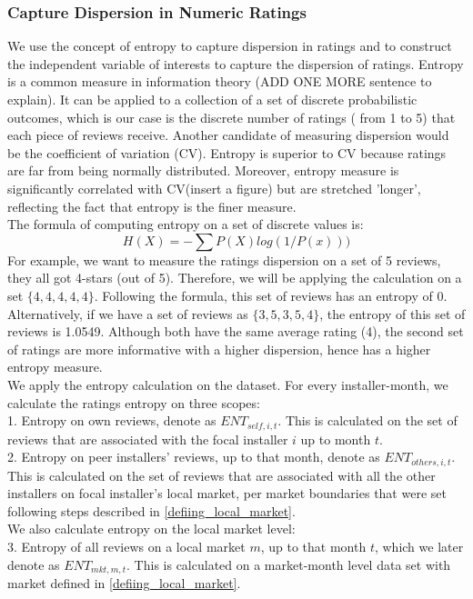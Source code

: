 \documentclass[msom,blindrev]{informs3}
\begin{document}
\subsubsection{Capture Dispersion in Numeric Ratings}
We use the concept of entropy to capture dispersion in ratings and to construct the independent variable of interests to capture the dispersion of ratings. Entropy is a common measure in information theory (ADD ONE MORE sentence to explain). It can be applied to a collection of a set of discrete probabilistic outcomes, which is our case is the discrete number of ratings ( from 1 to 5) that each piece of reviews receive. Another candidate of measuring dispersion would be the coefficient of variation (CV). Entropy is superior to CV because ratings are far from being normally distributed. Moreover, entropy measure is significantly correlated with CV(insert a figure) but are stretched 'longer', reflecting the fact that entropy is the finer measure. \\ 
The formula of computing entropy on a set of discrete values is:  \\ 
\begin{equation}
H(X)=-\sum P(X)log(1/P(x)))
\end{equation}
For example, we want to measure the ratings dispersion on a set of 5 reviews, they all got 4-stars (out of 5). Therefore, we will be applying the calculation on a set $\{4,4,4,4,4\}$. Following the formula, this set of reviews has an entropy of 0. Alternatively, if we have a set of reviews as $\{3,5,3,5,4\}$, the entropy of this set of reviews is 1.0549.  Although both have the same average rating (4), the second set of ratings are more informative with a higher dispersion, hence has a higher entropy measure. \\

We apply the entropy calculation on the dataset. For every installer-month, we calculate the ratings entropy on three scopes: \\
1. Entropy on own reviews, denote as $ENT_{self,i,t}$. This is calculated on the set of reviews that are associated with the focal installer $i$ up to month $t$.  \\ 
2. Entropy on peer installers' reviews, up to that month, denote as $ENT_{others,i,t}$. This is calculated on the set of reviews that are associated with all the other installers on focal installer's local market, per market boundaries that were set following steps described in \ref{defiing_local_market}.  \\
We also calculate entropy on the local market level:\\
3. Entropy of all reviews on a local market $m$, up to that month $t$, which we later denote as $ENT_{mkt,m,t}$. This is calculated on a market-month level data set with market defined in \ref{defiing_local_market}. 
\end{document}
